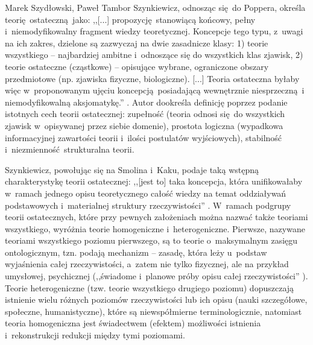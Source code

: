 \begin{artplenv2auth}{Marek Szydłowski, Paweł Tambor}
Szynkiewicz, odnosząc się~do Poppera, określa teorię~ostateczną~jako: ,,[...] propozycję~stanowiącą końcowy, pełny i~niemodyfikowalny fragment wiedzy teoretycznej. Koncepcje tego typu, z~uwagi na ich zakres, dzielone są zazwyczaj na dwie zasadnicze klasy: 1) teorie wszystkiego -- najbardziej ambitne i~odnoszące się do wszystkich klas zjawisk, 2) teorie ostateczne (cząstkowe) -- opisujące wybrane, ograniczone obszary przedmiotowe (np. zjawiska fizyczne, biologiczne). [...] Teoria ostateczna byłaby więc w~proponowanym ujęciu koncepcją~posiadającą wewnętrznie niesprzeczną~i niemodyfikowalną aksjomatykę.''
\parencite[][s.~1274–1275]{szynkiewicz_teorie_2011}. %
 Autor dookreśla definicję poprzez podanie istotnych cech teorii ostatecznej: zupełność (teoria odnosi się~do wszystkich zjawisk w~opisywanej przez siebie domenie), prostota logiczna (wypadkowa informacyjnej zawartości teorii i~ilości postulatów wyjściowych), stabilność i~niezmienność~strukturalna teorii.

Szynkiewicz, powołując się na Smolina i~Kaku, podaje taką wstępną charakterystykę teorii ostatecznej: ,,[jest to] taka koncepcja, która unifikowałaby w~ramach jednego opisu teoretycznego całość wiedzy na temat oddziaływań podstawowych i~materialnej struktury rzeczywistości''
\parencite[][s.~16]{szynkiewicz_teorie_2009}. %
 W~ramach podgrupy teorii ostatecznych, które przy pewnych założeniach można nazwać także teoriami wszystkiego, wyróżnia teorie homogeniczne i~heterogeniczne. Pierwsze, nazywane teoriami wszystkiego poziomu pierwszego, są to teorie o~maksymalnym zasięgu ontologicznym, tzn. podają mechanizm -- zasadę, która leży u~podstaw wyjaśnienia całej rzeczywistości, a~zatem nie tylko fizycznej, ale na przykład umysłowej, psychicznej (,,świadome i~planowe próby opisu całej rzeczywistości'' 
\parencite[][s.~30]{szynkiewicz_teorie_2009}%
). Teorie heterogeniczne (tzw. teorie wszystkiego drugiego poziomu) dopuszczają istnienie wielu różnych poziomów rzeczywistości lub ich opisu (nauki szczegółowe, społeczne, humanistyczne), które są niewspółmierne terminologicznie, natomiast teoria homogeniczna jest świadectwem (efektem) możliwości istnienia i~rekonstrukcji redukcji między tymi poziomami.


\end{artplenv2auth}
